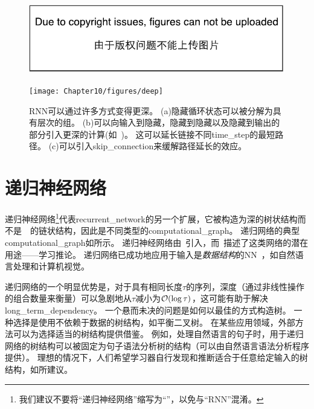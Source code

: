 
\begin{figure}[!htb]
\ifOpenSource
\centerline{\includegraphics{figure.pdf}}
\else
\centerline{\texttt{[image: Chapter10/figures/deep]}}
\fi
\caption{\gls{RNN}可以通过许多方式变得更深\citep{Pascanu-et-al-ICLR2014}。
(a)隐藏循环状态可以被分解为具有层次的组。
(b)可以向输入到隐藏，隐藏到隐藏以及隐藏到输出的部分引入更深的计算(如~)。
这可以延长链接不同\gls{time_step}的最短路径。
(c)可以引入\gls{skip_connection}来缓解路径延长的效应。
}
\label{fig:chap10_deep}
\end{figure}

\section{递归神经网络}
\label{sec:recursive_neural_networks}
递归神经网络\footnote{我们建议不要将``递归神经网络''缩写为``''，以免与``\gls{RNN}''混淆。}代表\gls{recurrent_network}的另一个扩展，它被构造为深的树状结构而不是~~的链状结构，因此是不同类型的\gls{computational_graph}。
递归网络的典型\gls{computational_graph}如所示。
递归神经网络由~\cite{Pollack90}引入，而~\cite{tr-bottou-2011}描述了这类网络的潜在用途——学习推论。
递归网络已成功地应用于输入是\emph{数据结构}的\gls{NN}~\citep{Frasconi97,Frasconi-1998}，如自然语言处理\citep{Socher+al-NIPS2011,Socher+al-EMNLP2011-small,Socher-et-al-EMNLP2013}和计算机视觉\citep{Socher-2011}。


递归网络的一个明显优势是，对于具有相同长度$\tau$的序列，深度（通过非线性操作的组合数量来衡量）可以急剧地从$\tau$减小为$\mathcal{O}(\log \tau)$，这可能有助于解决\gls{long_term_dependency}。
一个悬而未决的问题是如何以最佳的方式构造树。
一种选择是使用不依赖于数据的树结构，如平衡二叉树。
在某些应用领域，外部方法可以为选择适当的树结构提供借鉴。
例如，处理自然语言的句子时，用于递归网络的树结构可以被固定为句子语法分析树的结构（可以由自然语言语法分析程序提供）\citep{Socher+al-NIPS2011,Socher+al-EMNLP2011-small}。
理想的情况下，人们希望学习器自行发现和推断适合于任意给定输入的树结构，如\citep{tr-bottou-2011}所建议。

